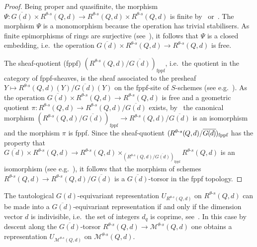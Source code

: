 \documentclass[10pt,a4paper]{amsart}
\newcommand{\ie}{i.e.\ }
\theoremstyle{definition}
\providecommand{\eg}{e.g.\ }
\newcommand*{\mk}{\mkern -1mu}
\begin{document}
\begin{proof}
Being proper and quasifinite, the morphism $\Psi\colon\overline{G(d)}\times 
R^{\theta\text{-}s}(Q,d)\to R^{\theta\text{-}s}(Q,d)\times R^{\theta\text{-}s}(Q,d)$ 
is finite by~\cite[III (1), (4.4.2)]{EGA} or~\cite[IV (3), (8.11.1)]{EGA}.
The morphism $\Psi$ is a monomorphism because the operation has trivial stabilisers.
As finite epimorphisms of rings are surjective (see~\cite[Ch.~IV, Prop.~1.7]{La69}), 
it follows that $\Psi$ is a closed embedding, \ie the operation
$\overline{G(d)}\times R^{\theta\text{-}s}(Q,d)\to R^{\theta\text{-}s}(Q,d)$ is free.

The sheaf-quotient (fppf) $(R^{\theta\text{-}s}(Q,d)/\overline{G(d)})_{\text{fppf}}$,
\ie the quotient in the category of fppf-sheaves, is the sheaf associated 
to the presheaf $Y\mapsto R^{\theta\text{-}s}(Q,d)(Y)/\overline{G(d)}(Y)$ 
on the fppf-site of $S$-schemes (see \eg \cite[3.4.1]{Br14}). As the operation 
$\overline{G(d)}\times R^{\theta\text{-}s}(Q,d)\to R^{\theta\text{-}s}(Q,d)$ 
is free and a geometric quotient
$\pi\colon R^{\theta\text{-}s}(Q,d)\to R^{\theta\text{-}s}(Q,d)/\overline{G(d)}$ 
exists, by~\cite[Thm.~6]{An73} the canonical morphism
$(R^{\theta\text{-}s}(Q,d)/\overline{G(d)})_{\text{fppf}}\to 
R^{\theta\text{-}s}(Q,d)/\overline{G(d)}$ 
is an isomorphism and the morphism $\pi$ is fppf. 
Since the sheaf-quotient 
$(\mk R^{\theta\text{-}s}(\mk Q,\mk d)/\overline{G\mk (\mk d\mk )}\mk )_{\text{fppf}}$
has the property that $\overline{G(d)}\times R^{\theta\text{-}s}(Q,d)\to
R^{\theta\text{-}s}(Q,d)\times_{(R^{\theta\text{-}s}(Q,d)/
\overline{G(d)})_{\text{fppf}}}R^{\theta\text{-}s}(Q,d)$
is an isomorphism (see \eg \cite[3.4.5]{Br14}), it follows that the morphism 
of schemes $R^{\theta\text{-}s}(Q,d)\to R^{\theta\text{-}s}(Q,d)/\overline{G(d)}$ 
is a $\overline{G(d)}$-torsor in the fppf topology.
\end{proof}

The tautological $G(d)$-equivariant representation $U_{R^{\theta\text{-}s}(Q,d)}$
on $R^{\theta\text{-}s}(Q,d)$ can be made into a $\overline{G(d)}$-equivariant 
representation if and only if the dimension vector $d$ is indivisible, 
\ie the set of integers $d_q$ is coprime, see~\cite[Proof of Prop.~5.3]{Ki94}.
In this case by descent along the $\overline{G(d)}$-torsor
$R^{\theta\text{-}s}(Q,d)\to\mathcal M^{\theta\text{-}s}(Q,d)$ one obtains
a representation $U_{\mathcal M^{\theta\text{-}s}(Q,d)}$ 
on $\mathcal M^{\theta\text{-}s}(Q,d)$.
\end{document}
